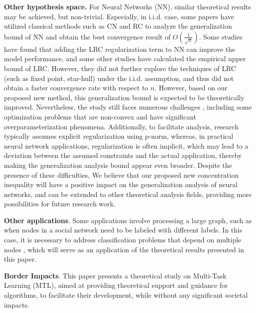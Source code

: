 \documentclass{article}
\begin{document}
\textbf{Other hypothesis space.} For Neural Networks (NN), similar theoretical results may be achieved, but non-trivial. 
Especially, in i.i.d. case, some papers have utilized classical methods such as CN \cite{cn2024nn} and RC \cite{rcnn2024} to analyze the generalization bound of NN and obtain the best convergence result of $O(\frac{1}{\sqrt{n}})$. Some studies \cite{empiricallrc19} have found that adding the LRC regularization term to NN can improve the model performance, and some other studies \cite{lrcbound21} have calculated the empirical upper bound of LRC. However, they did not further explore the techniques of LRC (such as fixed point, star-hull) under the i.i.d. assumption, and thus did not obtain a faster convergence rate with respect to $n$.
However, based on our proposed new method, this generalization bound is expected to be theoretically improved. Nevertheless, the study still faces numerous challenges \cite{18nnoverparameter}, including some optimization problems that are non-convex and have significant overparameterization phenomena. Additionally, to facilitate analysis, research \cite{CNnn19} typically assumes explicit regularization using p-norm, whereas, in practical neural network applications, regularization is often implicit, which may lead to a deviation between the assumed constraints \cite{rc18nn} and the actual application, thereby making the generalization analysis bound appear even broader. 
Despite the presence of these difficulties, We believe that our proposed new concentration inequality will have a positive impact on the generalization analysis of neural networks, and can be extended to other theoretical analysis fields, providing more possibilities for future research work.

\textbf{Other applications}. Some applications involve processing a large graph, such as when nodes in a social network need to be labeled with different labels. In this case, it is necessary to address classification problems that depend on multiple nodes \cite{11nodeclassification}, which will serve as an application of the theoretical results presented in this paper.

\textbf{Border Impacts}. This paper presents a theoretical study on Multi-Task Learning (MTL), aimed at providing theoretical support and guidance for algorithms, to facilitate their development, while without any significant societal impacts. 
\end{document}
